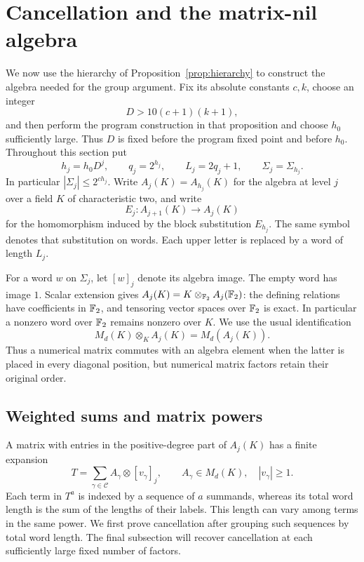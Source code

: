 \section{Cancellation and the matrix-nil algebra}
\label{sec:cancellation}

We now use the hierarchy of Proposition~\ref{prop:hierarchy} to
construct the algebra needed for the group argument.  Fix its absolute
constants $c,k$, choose an integer
\begin{equation}
  D>10(c+1)(k+1),
  \label{ca:D}
\end{equation}
and then perform the program construction in that proposition and choose
$h_0$ sufficiently large.  Thus $D$ is fixed before the program fixed point
and before $h_0$.  Throughout this section put
\[
  h_j=h_0D^j,\qquad q_j=2^{h_j},\qquad
  L_j=2q_j+1,\qquad \Sigma_j=\Sigma_{h_j}.
\]
In particular $|\Sigma_j|\leq 2^{ch_j}$.  Write $A_j(K)=A_{h_j}(K)$ for
the algebra at level $j$ over a field $K$ of characteristic two, and write
\[
  E_j:A_{j+1}(K)\longrightarrow A_j(K)
\]
for the homomorphism induced by the block substitution $E_{h_j}$.  The
same symbol denotes that substitution on words.  Each upper letter is
replaced by a word of length $L_j$.

For a word $w$ on $\Sigma_j$, let $[w]_j$ denote its algebra image.  The
empty word has image $1$.  Scalar extension gives
$A_j(K)=K\otimes_{\mathbb F_2}A_j(\mathbb F_2)$: the defining relations have coefficients
in $\mathbb F_2$, and tensoring vector spaces over $\mathbb F_2$ is exact.  In particular
a nonzero word over $\mathbb F_2$ remains nonzero over $K$.  We use the usual
identification
\[
  M_d(K)\otimes_K A_j(K)=M_d(A_j(K)).
\]
Thus a numerical matrix commutes with an algebra element when the latter
is placed in every diagonal position, but numerical matrix factors retain
their original order.

\subsection{Weighted sums and matrix powers}

A matrix with entries in the positive-degree part of $A_j(K)$ has a
finite expansion
\[
 T=\sum_{\gamma\in\mathcal C}
 A_\gamma\otimes[v_\gamma]_j,
 \qquad A_\gamma\in M_d(K),\quad |v_\gamma|\geq1.
\]
Each term in $T^a$ is indexed by a sequence of $a$ summands, whereas its
total word length is the sum of the lengths of their labels. This length
can vary among terms in the same power. We first prove
cancellation after grouping such sequences by total word length. The
final subsection will recover cancellation at each sufficiently large
fixed number of factors.

